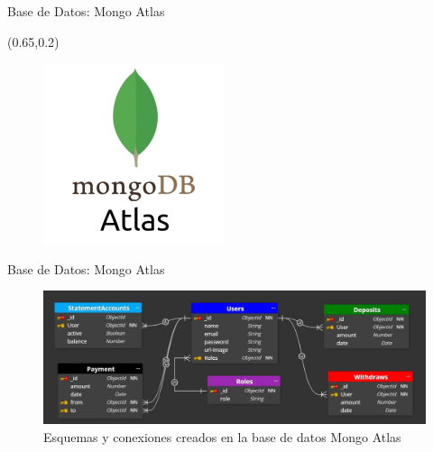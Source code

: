\documentclass[xcolor=pdftex,dvipsnames,table]{beamer}
\begin{document}
\begin{frame}{Base de Datos: Mongo Atlas}
    
    \begin{textblock*}{0.5\textwidth}(0.65\textwidth,0.2\textwidth)
        \begin{figure}
            \centering
            \includegraphics[width=0.7\linewidth]{bd/mongo.png}
            \label{fig:my_label}
        \end{figure}
    \end{textblock*}
\end{frame}
\begin{frame}{Base de Datos: Mongo Atlas}
    \begin{figure}[htb]
        \centering
        \captionsetup{justification=centering,margin=0.3cm}
        \includegraphics[width=1\linewidth]{bd/bdmongoatlas.jpeg}
        \caption*{\footnotesize  Esquemas y conexiones creados en la base de datos Mongo Atlas}
    \end{figure} 
\end{frame}
\end{document}
